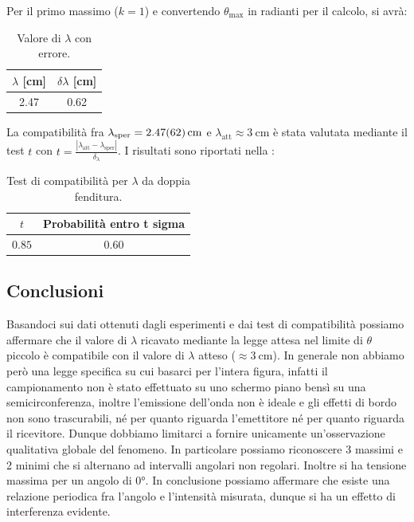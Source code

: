 \documentclass[a4paper]{article}
\begin{document}
Per il primo massimo ($k=1$) e convertendo $\theta_{\text{max}}$ in radianti per il calcolo, si avrà:
\begin{table}[H]
\centering
\caption{Valore di $\lambda$ con errore.}
\label{tab:valori_di_lambda}
\begin{tabular}{|c|c|}
\hline
$\lambda$ [\si{\centi\metre}] & $\delta\lambda$ [\si{\centi\metre}] \\
\hline
\num{2.47} & \num{0.62} \\
\hline
\end{tabular}
\end{table}
La compatibilità fra $\lambda_{\text{sper}} = \SI{2.47 \pm 0.62}{\centi\metre}$ e $\lambda_{\text{att}} \approx \SI{3}{\centi\metre}$ è stata valutata mediante il test $t$ con $t=\frac{|\lambda_{\text{att}}-\lambda_{\text{sper}}|}{\delta_{\lambda}}$. I risultati sono riportati nella :
\begin{table}[H]
\centering
\caption{Test di compatibilità per $\lambda$ da doppia fenditura.}
\label{tab:test_compatibilita_doppia_fenditura}
\begin{tabular}{|c|c|}
\hline
$t$ & Probabilità entro t sigma \\
\hline
$0.85$ & $0.60$ \\
\hline
\end{tabular}
\end{table}


\subsection{Conclusioni}
Basandoci sui dati ottenuti dagli esperimenti e dai test di compatibilità possiamo affermare che il valore di $\lambda$ ricavato mediante la legge attesa nel limite di $\theta$ piccolo è compatibile con il valore di $\lambda$ atteso ($\approx \SI{3}{\centi\metre}$). In generale non abbiamo però una legge specifica su cui basarci per l'intera figura, infatti il campionamento non è stato effettuato su uno schermo piano bensì su una semicirconferenza, inoltre l'emissione dell'onda non è ideale e gli effetti di bordo non sono trascurabili, né per quanto riguarda l'emettitore né per quanto riguarda il ricevitore. Dunque dobbiamo limitarci a fornire unicamente un'osservazione qualitativa globale del fenomeno. In particolare possiamo riconoscere 3 massimi e 2 minimi che si alternano ad intervalli angolari non regolari. Inoltre si ha tensione massima per un angolo di $\ang{0}$. In conclusione possiamo affermare che esiste una relazione periodica fra l'angolo e l'intensità misurata, dunque si ha un effetto di interferenza evidente.
\end{document}
